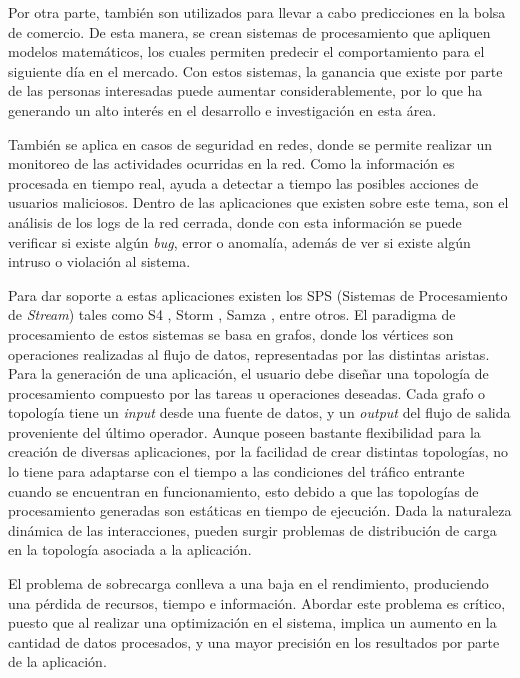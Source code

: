 Por otra parte, también son utilizados para llevar a cabo predicciones en la bolsa de comercio\normalsize{. De esta manera,} se crean sistemas de procesamiento que apliquen modelos matemáticos, los cuales permiten predecir el comportamiento para el siguiente día en el mercado. Con estos sistemas, la ganancia que existe por parte de las personas interesadas puede aumentar considerablemente, por lo que ha generando un alto interés en el desarrollo e investigación en esta área.

También se aplica en casos de seguridad en redes, donde se permite realizar un monitoreo de las actividades ocurridas en la red. Como la información es procesada en tiempo real, ayuda a detectar a tiempo las posibles acciones de usuarios maliciosos. Dentro de las aplicaciones que existen sobre este tema, \normalsize{son el análisis de los logs de la red cerrada}, donde con esta información se puede verificar si existe algún \textit{bug}, error o anomalía, además de ver si existe algún intruso o violación al sistema.

Para dar soporte a estas aplicaciones existen los SPS (Sistemas de Procesamiento de \textit{Stream}) tales como S4 \citep{s4yahoo}, Storm \citep{stormtwitter}, Samza \citep{samza}, entre otros. El paradigma de procesamiento de estos sistemas se basa en grafos, donde los vértices son operaciones realizadas al flujo de datos, representadas por las distintas aristas. Para la generación de una aplicación, el usuario debe diseñar una topología de procesamiento compuesto por las tareas u operaciones deseadas. Cada grafo o topología tiene un \textit{input} desde una fuente de datos, y un \textit{output} del flujo de salida proveniente del último operador. Aunque poseen bastante flexibilidad para la creación de diversas aplicaciones, por la facilidad de crear distintas topologías, no lo tiene para adaptarse con el tiempo a las condiciones del tráfico \normalsize{entrante} cuando se encuentran en funcionamiento, esto debido a que las topolog\'ias de procesamiento generadas son est\'aticas en tiempo de ejecución. Dada la naturaleza din\'amica de las interacciones, pueden surgir problemas de distribución de carga en la topología asociada a la aplicación.

El problema de sobrecarga conlleva a una baja en el rendimiento, produciendo una pérdida de recursos, tiempo e información. Abordar este problema es crítico, puesto que al realizar una optimización en el sistema, implica un aumento en la cantidad de datos procesados, y una mayor precisión en los resultados por parte de la aplicación.

